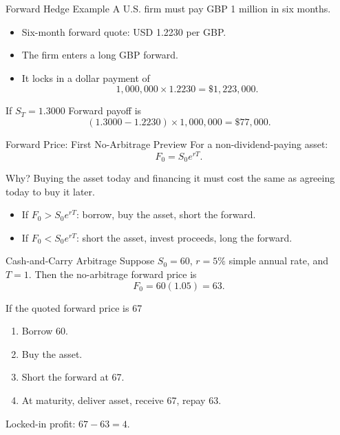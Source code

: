 \documentclass[aspectratio=169,11pt]{beamer}
\begin{document}
\begin{frame}{Forward Hedge Example}
    A U.S. firm must pay GBP 1 million in six months.

    \begin{itemize}
        \item Six-month forward quote: USD 1.2230 per GBP.
        \item The firm enters a long GBP forward.
        \item It locks in a dollar payment of
        \[
            1{,}000{,}000 \times 1.2230 = \$1{,}223{,}000.
        \]
    \end{itemize}

    \begin{exampleblock}{If $S_T=1.3000$}
        Forward payoff is
        \[
            (1.3000-1.2230)\times 1{,}000{,}000=\$77{,}000.
        \]
    \end{exampleblock}
\end{frame}

\begin{frame}{Forward Price: First No-Arbitrage Preview}
    For a non-dividend-paying asset:
    \[
        F_0 = S_0 e^{rT}.
    \]

    \begin{block}{Why?}
        Buying the asset today and financing it must cost the same as agreeing today to buy it later.
    \end{block}

    \begin{itemize}
        \item If $F_0>S_0e^{rT}$: borrow, buy the asset, short the forward.
        \item If $F_0<S_0e^{rT}$: short the asset, invest proceeds, long the forward.
    \end{itemize}
\end{frame}

\begin{frame}{Cash-and-Carry Arbitrage}
    Suppose $S_0=60$, $r=5\%$ simple annual rate, and $T=1$.
    Then the no-arbitrage forward price is
    \[
        F_0 = 60(1.05)=63.
    \]

    \begin{alertblock}{If the quoted forward price is 67}
        \begin{enumerate}
            \item Borrow 60.
            \item Buy the asset.
            \item Short the forward at 67.
            \item At maturity, deliver asset, receive 67, repay 63.
        \end{enumerate}
        Locked-in profit: $67-63=4$.
    \end{alertblock}
\end{frame}
\end{document}
